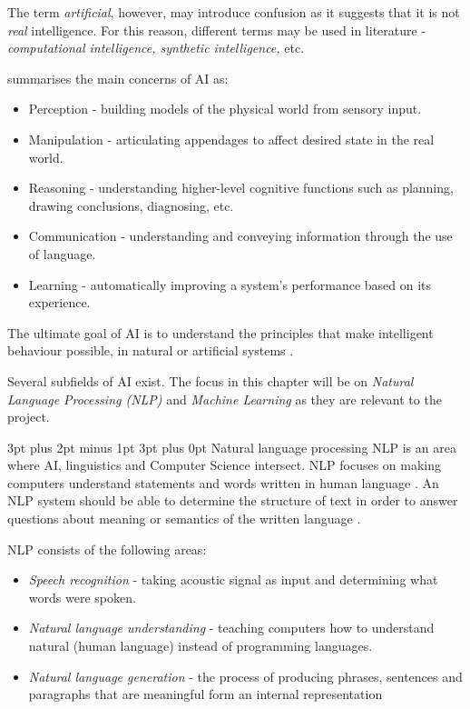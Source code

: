 \documentclass[12pt,a4paper]{article}
\makeatletter
\renewcommand\subsection{\@startsection {subsection}{1}{2mm} %
                               {3pt plus 2pt minus 1pt} %
                               {3pt plus 0pt} %
                               {\normalfont\bfseries}}
\makeatother
\begin{document}
The term \textit{artificial}, however, may introduce confusion as it suggests that it is not \textit{real} intelligence. For this reason, different terms may be used in literature - \textit{computational intelligence, synthetic intelligence,} etc. 

\cite{williams1983brief} summarises the main concerns of AI as:
\begin{itemize}
 \item Perception - building models of the physical world from sensory input.
 \item Manipulation - articulating appendages to affect desired state in the real world.
 \item Reasoning - understanding higher-level cognitive functions such as planning, drawing conclusions, diagnosing, etc.
 \item Communication - understanding and conveying information through the use of language. 
 \item Learning - automatically improving a system's performance based on its experience.
\end{itemize}



The ultimate goal of AI is to understand the principles that make intelligent behaviour possible, in natural or artificial systems \cite{Poole:1997:CIL:275594}.

Several subfields of AI exist. The focus in this chapter will be on \textit{Natural Language Processing (NLP)} and \textit{Machine Learning} as they are relevant to the project.

\subsection{Natural language processing}
NLP is an area where AI, linguistics and Computer Science intersect. NLP focuses on making computers understand statements and words written in human language \cite{Khurana2017}. An NLP system should be able to determine the structure of text in order to answer questions about meaning or semantics of the written language \cite{Martinez2010}.

NLP consists of the following areas:
\begin{itemize}
    \item \textit{Speech recognition} - taking acoustic signal as input and determining what words were spoken.
    \item \textit{Natural language understanding} - teaching computers how to understand natural (human language) instead of programming languages.
    \item \textit{Natural language generation} - the process of producing phrases, sentences and paragraphs that are meaningful form an internal representation \cite{Khurana2017}
\end{itemize}
\end{document}
